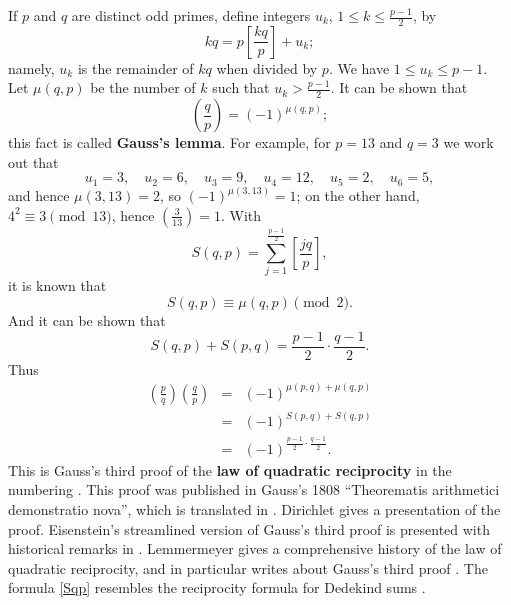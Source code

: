 \documentclass{amsart}
\begin{document}
If $p$ and $q$ are distinct odd primes, define integers $u_k$, $1 \leq k \leq \frac{p-1}{2}$, by
\[
kq=p \left[ \frac{kq}{p} \right] + u_k;
\]
namely, $u_k$ is the remainder of $kq$ when divided by $p$.
We have $1 \leq u_k \leq p-1$. Let $\mu(q,p)$ be the number of $k$ such that $u_k > \frac{p-1}{2}$. 
It can be shown that
\cite[p.~74, Theorem 92]{wright} 
\[
\left( \frac{q}{p} \right)=(-1)^{\mu(q,p)};
\]
this fact is called \textbf{Gauss's lemma}.
For example, for $p=13$ and $q=3$ we work out that
\[
u_1=3, \quad u_2=6, \quad u_3 = 9, \quad u_4=12, \quad u_5=2, \quad u_6=5,
\]
and hence $\mu(3,13)=2$, so $(-1)^{\mu(3,13)}=1$; on the other hand, $4^2 \equiv 3 \pmod{13}$, hence $\left( \frac{3}{13} \right)=1$.
With
\[
S(q,p)=\sum_{j=1}^{\frac{p-1}{2}} \left[ \frac{jq}{p} \right],
\]
it
is known that  \cite[pp.~77-78, \S 6.13]{wright} 
\[
S(q,p) \equiv \mu(q,p) \pmod{2}.
\]
And it can  be shown that \cite[p.~76, Theorem 100]{wright} 
\begin{equation}
S(q,p)+S(p,q)=\frac{p-1}{2} \cdot \frac{q-1}{2}.
\label{Sqp}
\end{equation}
Thus
\begin{eqnarray*}
\left( \frac{p}{q} \right) \left( \frac{q}{p} \right)&=&(-1)^{\mu(p,q)+\mu(q,p)}\\
&=&(-1)^{S(p,q)+S(q,p)}\\
&=&(-1)^{\frac{p-1}{2} \cdot \frac{q-1}{2}}.
\end{eqnarray*}
This is Gauss's third proof of the \textbf{law of quadratic reciprocity} in the numbering \cite[p.~50, \S 20]{werke}. This proof
was published in Gauss's 1808 ``Theorematis arithmetici demonstratio nova'', which is translated in \cite[pp.~112--118]{smith}.
Dirichlet \cite[pp.~65--72, \S\S 42--44]{dirichlet} gives a presentation of the proof.
Eisenstein's streamlined version of Gauss's third proof is presented with historical remarks in \cite{eisenstein}.
Lemmermeyer \cite{lemmermeyer} gives a comprehensive history of the law of quadratic reciprocity, and in particular writes about Gauss's third proof  \cite[pp.~9--10]{lemmermeyer}.
The formula \eqref{Sqp} resembles the reciprocity formula for Dedekind sums \cite[p.~4, Theorem~1]{rademacher}.
\end{document}
